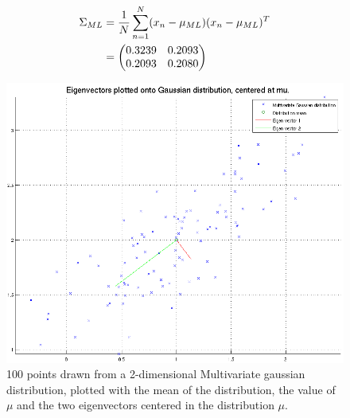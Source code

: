 \begin{align}
	\Sigma_{ML} &= \frac{1}{N} \sum_{n=1}^N (x_n - \mu_{ML}) (x_n - \mu_{ML})^T \notag \\
	&= \begin{pmatrix}
		0.3239 & 0.2093 \\
		0.2093 & 0.2080
	\end{pmatrix} \label{eq:cov}
\end{align}

\begin{figure}[h!]
	\includegraphics[width=\textwidth]{img/multigausseigen}
	\caption{100 points drawn from a 2-dimensional Multivariate gaussian
          distribution, plotted with the mean of the distribution, the value of
          $\mu$ and the two eigenvectors centered in the distribution
          $\mu$. \label{fig:I.2.4.1}}
\end{figure}

